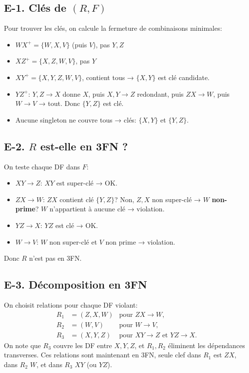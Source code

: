 \documentclass[a4paper,11pt]{article}
\begin{document}
\subsection*{E-1. Clés de $(R,F)$}
Pour trouver les clés, on calcule la fermeture de combinaisons minimales:
\begin{itemize}
  \item $WX^+ = \{W,X,V\}$ (puis $V$), pas $Y,Z$
  \item $XZ^+ = \{X,Z,W,V\}$, pas $Y$
  \item $XY^+ = \{X,Y,Z,W,V\}$, contient tous → $\{X,Y\}$ est clé candidate.
  \item $YZ^+$: $Y,Z \to X$ donne $X$, puis $X,Y \to Z$ redondant, puis $ZX \to W$, puis $W\to V$ → tout. Donc $\{Y,Z\}$ est clé.
  \item Aucune singleton ne couvre tous → clés: $\{X,Y\}$ et $\{Y,Z\}$.
\end{itemize}

\subsection*{E-2. $R$ est-elle en 3FN ?}
On teste chaque DF dans $F$:
\begin{itemize}
  \item $XY\to Z$: $XY$ est super-clé → OK.
  \item $ZX\to W$: $ZX$ contient clé $\{Y,Z\}$? Non, $Z,X$ non super-clé → $W$ \textbf{non-prime}? $W$ n'appartient \`a aucune clé → violation.
  \item $YZ\to X$: $YZ$ est clé → OK.
  \item $W\to V$: $W$ non super-clé et $V$ non prime → violation.
\end{itemize}
Donc $R$ n'est pas en 3FN.

\subsection*{E-3. D\'ecomposition en 3FN}
On choisit relations pour chaque DF violant:
\begin{align*}
 R_1 &= (Z,X,W) &\text{pour }ZX\to W, \\
 R_2 &= (W,V)   &\text{pour }W\to V, \\
 R_3 &= (X,Y,Z) &\text{pour }XY\to Z \text{ et } YZ\to X.
\end{align*}
On note que $R_3$ couvre les DF entre $X,Y,Z$, et $R_1,R_2$ éliminent les dépendances transverses. 
Ces relations sont maintenant en 3FN, seule clef dans $R_1$ est $ZX$, dans $R_2$ $W$, et dans $R_3$ $XY$ (ou $YZ$).
\end{document}
